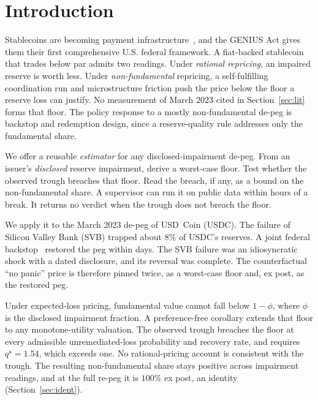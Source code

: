 \section{Introduction}
\label{sec:intro}

Stablecoins are becoming payment infrastructure~\cite{geniusact2025}, and the GENIUS Act
gives them their first comprehensive U.S. federal framework. A fiat-backed stablecoin that
trades below par admits two readings. Under \emph{rational repricing}, an impaired reserve
is worth less. Under \emph{non-fundamental} repricing, a self-fulfilling coordination run
and microstructure friction push the price below the floor a reserve loss can justify. No
measurement of March 2023 cited in Section~\ref{sec:lit} forms that floor. The policy
response to a mostly non-fundamental de-peg is backstop and redemption design, since a
reserve-quality rule addresses only the fundamental share.

We offer a reusable \emph{estimator} for any disclosed-impairment de-peg. From an issuer's
\emph{disclosed} reserve impairment, derive a worst-case floor. Test whether the observed
trough breaches that floor. Read the breach, if any, as a bound on the non-fundamental
share. A supervisor can run it on public data within hours of a break. It returns no
verdict when the trough does not breach the floor.

We apply it to the March 2023 de-peg of USD~Coin (USDC). The failure of Silicon Valley
Bank (SVB) trapped about $8\%$ of USDC's reserves. A
joint federal backstop~\cite{fedtreasfdic2023pressrelease} restored the peg within days.
The SVB failure was an idiosyncratic shock with a dated disclosure, and its reversal was
complete. The counterfactual ``no panic'' price is therefore pinned twice, as a worst-case
floor and, ex post, as the restored peg.

Under expected-loss pricing, fundamental value cannot fall below $1-\phi$, where $\phi$ is
the disclosed impairment fraction. A preference-free corollary extends that floor to any
monotone-utility valuation. The observed trough breaches the floor at every admissible
unremediated-loss probability and recovery rate, and requires $q^{\star}=1.54$, which
exceeds one. No rational-pricing account is consistent with the trough. The resulting
non-fundamental share stays positive across impairment readings, and at the full re-peg it
is $100\%$ ex post, an identity (Section~\ref{sec:ident}).

